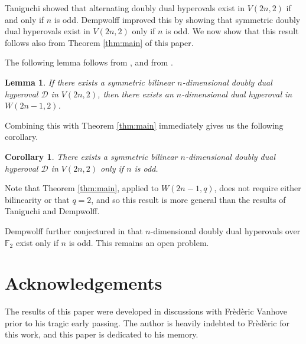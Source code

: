 \documentclass{amsart}
\theoremstyle{plain}
\newtheorem{corollary}{Corollary}
\newtheorem{lemma}{Lemma}
\theoremstyle{definition}
\begin{document}
Taniguchi \cite{Taniguchi2009} showed that alternating doubly dual hyperovals exist in $V(2n,2)$ if and only if $n$ is odd. Dempwolff \cite{Dempwolff2015} improved this by showing that symmetric doubly dual hyperovals exist in $V(2n,2)$ only if $n$ is odd. We now show that this result follows also from Theorem \ref{thm:main} of this paper.

The following lemma follows from \cite{Edel2010}, and from \cite[Lemma 3.8]{Dempwolff2013}.

\begin{lemma}
If there exists a symmetric bilinear $n$-dimensional doubly dual hyperoval ${\mathcal D}$ in $V(2n,2)$, then there exists an $n$-dimensional dual hyperoval in $W(2n-1,2)$.
\end{lemma}

Combining this with Theorem \ref{thm:main} immediately gives us the following corollary.

\begin{corollary}
There exists a symmetric bilinear $n$-dimensional doubly dual hyperoval ${\mathcal D}$ in $V(2n,2)$ only if $n$ is odd.
\end{corollary}

Note that Theorem \ref{thm:main}, applied to $W(2n-1,q)$, does not require either bilinearity or that $q=2$, and so this result is more general than the results of Taniguchi and Dempwolff.

Dempwolff further conjectured in \cite{Dempwolff2013} that $n$-dimensional doubly dual hyperovals over ${\mathbb{F}}_2$ exist only if $n$ is odd. This remains an open problem.

\section{Acknowledgements}

The results of this paper were developed in discussions with Fr\`ed\`eric Vanhove prior to his tragic early passing. The author is heavily indebted to Fr\`ed\`eric for this work, and this paper is dedicated to his memory.
\end{document}
